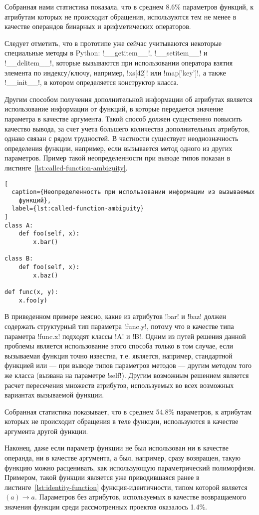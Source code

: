 Собранная нами статистика показала, что в среднем 8.6\% параметров функций, к
атрибутам которых не происходит обращения, используются тем не менее в качестве
операндов бинарных и арифметических операторов.

Следует отметить, что в прототипе уже сейчас учитываются некоторые специальные
методы в Python: !__getitem__!, !__setitem__! и !__delitem__!,
которые вызываются при использовании оператора взятия элемента по индексу/ключу,
например, !xs[42]! или !map['key']!, а также !__init__!, в котором определяется
конструктор класса.

Другим способом получения дополнительной информации об атрибутах является
использование информации от функций, в которые передается значение параметра в
качестве аргумента. Такой способ должен существенно повысить качество вывода, за
счет учета большего количества дополнительных атрибутов, однако связан с рядом
трудностей. В частности существует неоднозначность определения функции,
например, если вызывается метод одного из других параметров. Пример такой
неопределенности при выводе типов показан в
листинге~\ref{lst:called-function-ambiguity}.

\begin{lstlisting}[
  caption={Неопределенность при использовании информации из вызываемых
    функций},
  label={lst:called-function-ambiguity}
]
class A:
    def foo(self, x):
        x.bar()

class B:
    def foo(self, x):
        x.baz()

def func(x, y):
    x.foo(y)
\end{lstlisting}

В приведенном примере неясно, какие из атрибутов !bar! и !baz! должен содержать
структурный тип параметра !func.y!, потому что в качестве типа параметра
!func.x! подходят классы !A! и !B!. Одним из путей решения данной проблемы
является использование этого способа только в том случае, если вызываемая функция точно
известна, т.е. является, например, стандартной функцией или --- при выводе
типов параметров методов --- другим методом того же класса (вызвана на параметре
!self!). Другим возможным решением является расчет пересечения множеств
атрибутов, используемых во всех возможных вариантах вызываемой функции.

Собранная статистика показывает, что в среднем 54.8\% параметров, к атрибутам
которых не происходит обращения в теле функции, используются в качестве
аргумента другой функции.

Наконец, даже если параметр функции не был использован ни в качестве операнда,
ни в качестве аргумента, а был, например, сразу возвращен, такую функцию можно
расценивать, как использующую параметрический
полиморфизм. Примером, такой функции является уже приводившаяся ранее в
листинге~\ref{lst:identity-function} функция-идентичности, типом которой
является $(a) \rightarrow a$. Параметров без атрибутов, используемых в качестве
возвращаемого значения функции среди рассмотренных проектов оказалось 1.4\%.

